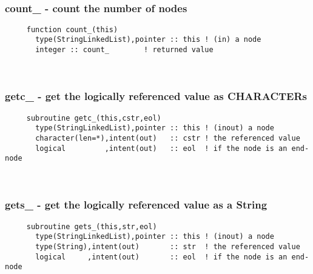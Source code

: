  
\mbox{}\hrulefill\ 
 

  \subsubsection{count\_ - count the number of nodes}

\begin{verbatim} 
     function count_(this)
       type(StringLinkedList),pointer :: this ! (in) a node
       integer :: count_		! returned value
 \end{verbatim}%
 
 
\mbox{}\hrulefill\ 
 

  \subsubsection{getc\_ - get the logically referenced value as CHARACTERs}

\begin{verbatim} 
     subroutine getc_(this,cstr,eol)
       type(StringLinkedList),pointer :: this ! (inout) a node
       character(len=*),intent(out)   :: cstr ! the referenced value
       logical         ,intent(out)   :: eol  ! if the node is an end-node
 \end{verbatim}%
 
 
\mbox{}\hrulefill\ 
 

  \subsubsection{gets\_ - get the logically referenced value as a String}

\begin{verbatim} 
     subroutine gets_(this,str,eol)
       type(StringLinkedList),pointer :: this ! (inout) a node
       type(String),intent(out)       :: str  ! the referenced value
       logical     ,intent(out)       :: eol  ! if the node is an end-node
 \end{verbatim}%
 
